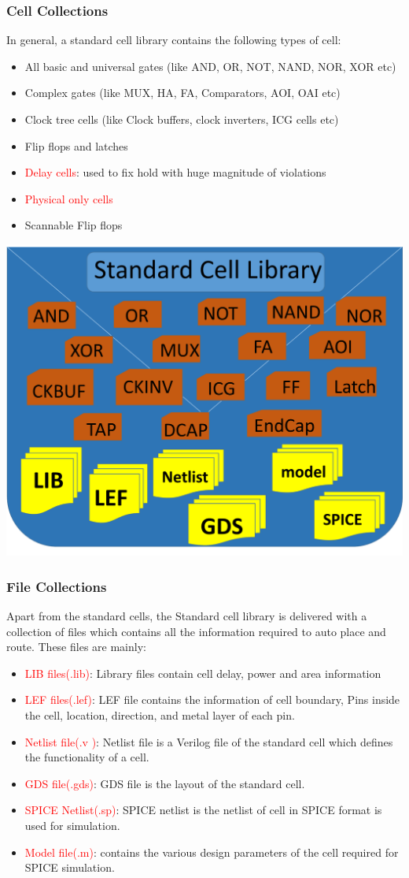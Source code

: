 \documentclass{beamer}
\begin{document}
	\begin{frame}
		\frametitle{Cell Collections}
		In general, a standard cell library contains the following types of cell:
		\begin{itemize}
			\item All basic and universal gates (like AND, OR, NOT, NAND, NOR, XOR etc)
			\item Complex gates (like MUX, HA, FA, Comparators, AOI, OAI etc)
			\item Clock tree cells (like Clock buffers, clock inverters, ICG cells etc)
			\item Flip flops and latches
			\item \textcolor {red} {Delay cells}: used to fix hold with huge magnitude of violations 
			\item \textcolor {red} {Physical only cells}
			\item Scannable Flip flops
		\end{itemize}	
		\begin{center}
		\includegraphics[width=0.35 \textwidth]{standardCellLib}
		\end{center}
	\end{frame}
	\begin{frame}
		\frametitle{File Collections}
		Apart from the standard cells, the Standard cell library is delivered with a collection of files which contains all the information required to auto place and route. These files are mainly:
		\begin{itemize}
			\item \textcolor {red} {LIB files(.lib)}: Library files contain cell delay, power and area information
			\item \textcolor {red} {LEF files(.lef)}: LEF file contains the information of cell boundary, Pins inside the cell, location, direction, and metal layer of each pin.
			\item \textcolor {red} {Netlist file(.v )}: Netlist file is a Verilog file of the standard cell which defines the functionality of a cell.
			\item \textcolor {red} {GDS file(.gds)}: GDS file is the layout of the standard cell.
			\item \textcolor {red} {SPICE Netlist(.sp)}: SPICE netlist is the netlist of cell in SPICE format is used for simulation.
			\item \textcolor {red} {Model file(.m)}: contains the various design parameters of the cell required for SPICE simulation. 
		\end{itemize}	
	\end{frame}
\end{document}
